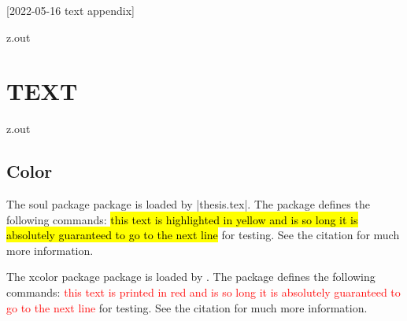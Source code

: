 [2022-05-16 text appendix]

\begin{VerbatimOut}{z.out}
\chapter{TEXT}

\end{VerbatimOut}

\MyIO


\begin{VerbatimOut}{z.out}


\section{Color}

The soul package \cite{franz2003} package is loaded by |thesis.tex|.
The package defines the following commands:
\hl{%
  this text is highlighted in yellow
  and is so long it is absolutely guaranteed
  to go to the next line%
} for testing.
See the citation for much more information.

The xcolor package \cite{kern2021} package is loaded by \PurdueThesisLogo.
The package defines the following commands:
\textcolor{red}{%
  this text is printed in red
  and is so long it is absolutely guaranteed
  to go to the next line%
} for testing.
See the citation for much more information.
\end{VerbatimOut}

\MyIO
  

